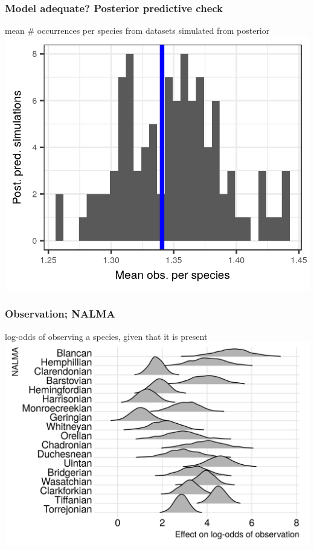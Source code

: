 \documentclass[aspectratio=169]{beamer}
\begin{document}
\begin{frame}
  \frametitle{Model adequate? Posterior predictive check}
  \begin{center}
    mean \# occurrences per species from datasets simulated from posterior
    \includegraphics[height=0.775\textheight,width=\textwidth,keepaspectratio=true]{figure/pred_occ_bd}
  \end{center}
\end{frame}

\begin{frame}
  \frametitle{Observation; NALMA}
  \begin{center}
    log-odds of observing a species, given that it is present
    \includegraphics[height=0.775\textheight,width=\textwidth,keepaspectratio=true]{figure/time_observation}
  \end{center}
\end{frame}
\end{document}
